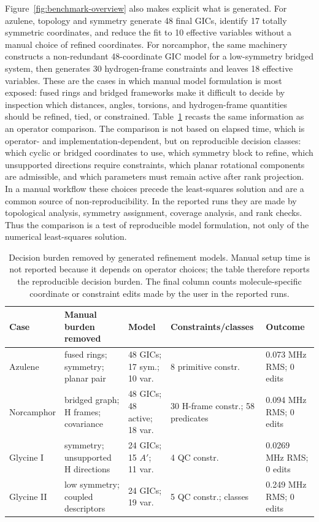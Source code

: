 \documentclass[aip,jcp,reprint,longbibliography,floatfix]{revtex4-2}
\begin{document}
Figure~\ref{fig:benchmark-overview} also makes explicit what is generated.
For azulene, topology and symmetry generate 48 final GICs, identify 17
totally symmetric coordinates, and reduce the fit to 10 effective variables
without a manual choice of refined coordinates. For norcamphor, the same
machinery constructs a non-redundant 48-coordinate GIC model for a
low-symmetry bridged system, then generates 30 hydrogen-frame constraints and
leaves 18 effective variables. These are the cases in which manual model
formulation is most exposed: fused rings and bridged frameworks make it
difficult to decide by inspection which distances, angles, torsions, and
hydrogen-frame quantities should be refined, tied, or constrained.
Table~\ref{tab:manual-vs-morpheus} recasts the same information as an
operator comparison. The comparison is not based on elapsed time, which is
operator- and implementation-dependent, but on reproducible decision classes:
which cyclic or bridged coordinates to use, which symmetry block to refine,
which unsupported directions require constraints, which planar rotational
components are admissible, and which parameters must remain active after rank
projection. In a manual workflow these choices precede the least-squares
solution and are a common source of non-reproducibility. In the reported runs
they are made by topological analysis, symmetry assignment, coverage analysis,
and rank checks. Thus the comparison is a test of reproducible model
formulation, not only of the numerical least-squares solution.

\begin{table}
\caption{Decision burden removed by generated refinement models. Manual setup time
is not reported because it depends on operator choices; the table therefore
reports the reproducible decision burden. The final column counts
molecule-specific coordinate or constraint edits made by the user in the
reported runs.}
\label{tab:manual-vs-morpheus}
\scriptsize
\setlength{\tabcolsep}{1.5pt}
\begin{tabular*}{\textwidth}{@{\extracolsep{\fill}}lllll@{}}
\toprule
Case & Manual burden removed & Model & Constraints/classes & Outcome \\
\midrule
Azulene &
fused rings; symmetry; planar pair &
48 GICs; 17 sym.; 10 var. &
8 primitive constr. &
0.073 MHz RMS; 0 edits \\
Norcamphor &
bridged graph; H frames; covariance &
48 GICs; 48 active; 18 var. &
30 H-frame constr.; 58 predicates &
0.094 MHz RMS; 0 edits \\
Glycine I &
symmetry; unsupported H directions &
24 GICs; 15 $A'$; 11 var. &
4 QC constr. &
0.0269 MHz RMS; 0 edits \\
Glycine II &
low symmetry; coupled descriptors &
24 GICs; 19 var. &
5 QC constr.; classes &
0.249 MHz RMS; 0 edits \\
\bottomrule
\end{tabular*}
\end{table}
\end{document}
